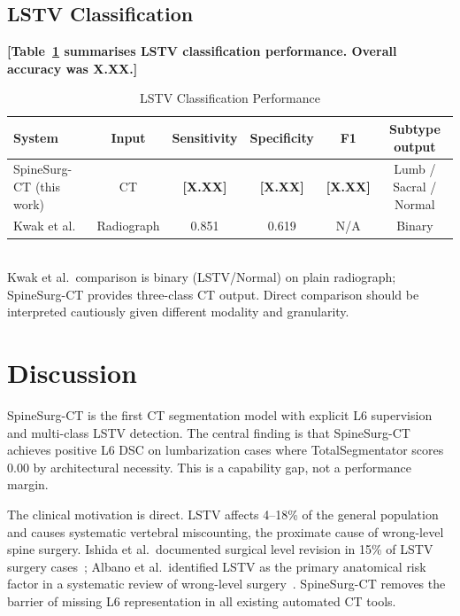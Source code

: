 \documentclass{article}
\newcommand{\ph}[1]{\textcolor{placeholder}{\textbf{[#1]}}}
\begin{document}
\subsection{LSTV Classification}

\ph{Table~\ref{tab:classification} summarises LSTV classification performance.
Overall accuracy was X.XX.}

\begin{table}[ht]
\centering
\caption{LSTV Classification Performance}
\label{tab:classification}
\begin{tabular}{lccccc}
\toprule
System & Input & Sensitivity & Specificity & F1 & Subtype output \\
\midrule
SpineSurg-CT (this work) & CT & \ph{X.XX} & \ph{X.XX} & \ph{X.XX}
  & Lumb / Sacral / Normal \\
Kwak et al.~\citep{kwak2025} & Radiograph & 0.851 & 0.619 & N/A
  & Binary \\
\bottomrule
\end{tabular}\\[2pt]
\footnotesize{Kwak et al.\ comparison is binary (LSTV/Normal) on plain
radiograph; SpineSurg-CT provides three-class CT output. Direct comparison
should be interpreted cautiously given different modality and granularity.}
\end{table}

\section{Discussion}

SpineSurg-CT is the first CT segmentation model with explicit L6 supervision
and multi-class LSTV detection. The central finding is that SpineSurg-CT
achieves positive L6 DSC on lumbarization cases where TotalSegmentator scores
0.00 by architectural necessity. This is a capability gap, not a performance
margin.

The clinical motivation is direct. LSTV affects 4--18\% of the general
population~\citep{apazidis2011,nardo2012} and causes systematic vertebral
miscounting, the proximate cause of wrong-level spine surgery. Ishida et al.\
documented surgical level revision in 15\% of LSTV surgery
cases~\citep{ishida2017}; Albano et al.\ identified LSTV as the primary
anatomical risk factor in a systematic review of wrong-level
surgery~\citep{albano2024}. SpineSurg-CT removes the barrier of missing L6
representation in all existing automated CT tools.
\end{document}
